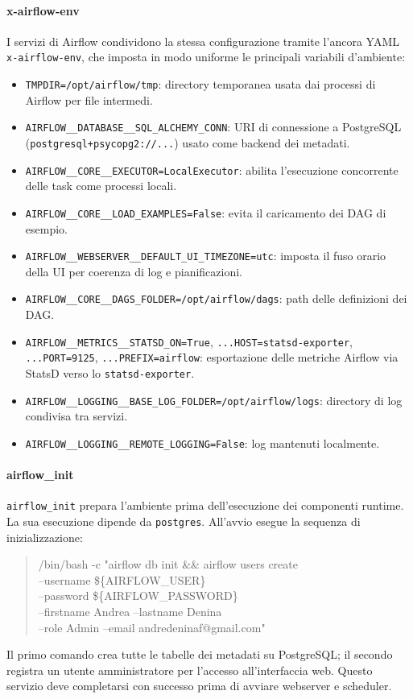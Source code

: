 \paragraph{x-airflow-env}
I servizi di Airflow condividono la stessa configurazione tramite l’ancora YAML \texttt{x-airflow-env}, che imposta in modo uniforme le principali variabili d’ambiente:
\begin{itemize}
  \item \texttt{TMPDIR=/opt/airflow/tmp}: directory temporanea usata dai processi di Airflow per file intermedi.
  \item \texttt{AIRFLOW\_\_DATABASE\_\_SQL\_ALCHEMY\_CONN}: URI di connessione a PostgreSQL (\texttt{postgresql+psycopg2://...}) usato come backend dei metadati.
  \item \texttt{AIRFLOW\_\_CORE\_\_EXECUTOR=LocalExecutor}: abilita l’esecuzione concorrente delle task come processi locali.
  \item \texttt{AIRFLOW\_\_CORE\_\_LOAD\_EXAMPLES=False}: evita il caricamento dei DAG di esempio.
  \item \texttt{AIRFLOW\_\_WEBSERVER\_\_DEFAULT\_UI\_TIMEZONE=utc}: imposta il fuso orario della UI per coerenza di log e pianificazioni.
  \item \texttt{AIRFLOW\_\_CORE\_\_DAGS\_FOLDER=/opt/airflow/dags}: path delle definizioni dei DAG.
  \item \texttt{AIRFLOW\_\_METRICS\_\_STATSD\_ON=True}, \texttt{...HOST=statsd-exporter}, \texttt{...PORT=9125}, \texttt{...PREFIX=airflow}: esportazione delle metriche Airflow via StatsD verso lo \texttt{statsd-exporter}.
  \item \texttt{AIRFLOW\_\_LOGGING\_\_BASE\_LOG\_FOLDER=/opt/airflow/logs}: directory di log condivisa tra servizi.
  \item \texttt{AIRFLOW\_\_LOGGING\_\_REMOTE\_LOGGING=False}: log mantenuti localmente.
\end{itemize}

\paragraph{airflow\_init}
\texttt{airflow\_init} prepara l’ambiente prima dell’esecuzione dei componenti runtime. La  sua esecuzione dipende da \texttt{postgres}. All’avvio esegue la sequenza di inizializzazione:
\begin{quote}\ttfamily
/bin/bash -c "airflow db init \&\& airflow users create \\
\phantom{xxxx}--username \$\{AIRFLOW\_USER\} \\
\phantom{xxxx}--password \$\{AIRFLOW\_PASSWORD\} \\
\phantom{xxxx}--firstname Andrea --lastname Denina \\
\phantom{xxxx}--role Admin --email andredeninaf@gmail.com"
\end{quote}
Il primo comando crea tutte le tabelle dei metadati su PostgreSQL; il secondo registra un utente amministratore per l’accesso all’interfaccia web. Questo servizio deve completarsi con successo prima di avviare webserver e scheduler.


